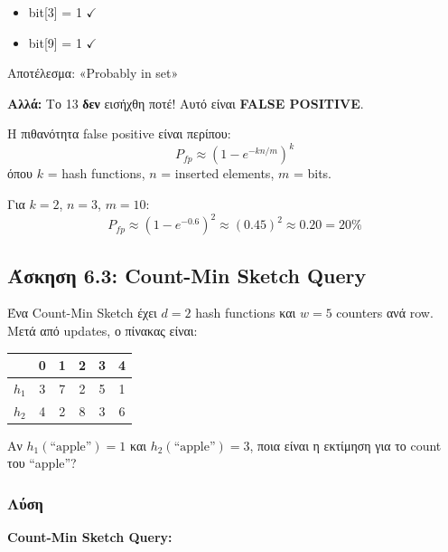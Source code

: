 \begin{itemize}
    \item bit[3] = 1 $\checkmark$
    \item bit[9] = 1 $\checkmark$
\end{itemize}

Αποτέλεσμα: «Probably in set»

\textbf{Αλλά:} Το 13 \textbf{δεν} εισήχθη ποτέ! Αυτό είναι \textbf{FALSE POSITIVE}.

\begin{warningbox}
Η πιθανότητα false positive είναι περίπου:
$$P_{fp} \approx \left(1 - e^{-kn/m}\right)^k$$
όπου $k$ = hash functions, $n$ = inserted elements, $m$ = bits.

Για $k=2$, $n=3$, $m=10$:
$$P_{fp} \approx (1 - e^{-0.6})^2 \approx (0.45)^2 \approx 0.20 = 20\%$$
\end{warningbox}

\subsection{Άσκηση 6.3: Count-Min Sketch Query}

\begin{formulabox}[Εκφώνηση]
Ένα Count-Min Sketch έχει $d = 2$ hash functions και $w = 5$ counters ανά row.
Μετά από updates, ο πίνακας είναι:

\begin{center}
\begin{tabular}{c|ccccc}
 & 0 & 1 & 2 & 3 & 4 \\
\hline
$h_1$ & 3 & 7 & 2 & 5 & 1 \\
$h_2$ & 4 & 2 & 8 & 3 & 6 \\
\end{tabular}
\end{center}

Αν $h_1(\text{``apple''}) = 1$ και $h_2(\text{``apple''}) = 3$, ποια είναι η εκτίμηση
για το count του ``apple''?
\end{formulabox}

\subsubsection*{Λύση}

\textbf{Count-Min Sketch Query:}

